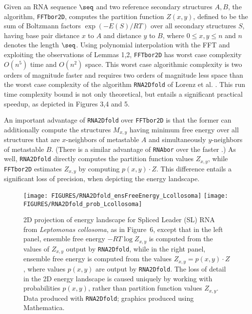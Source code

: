 Given an RNA sequence $\seq$ and two reference secondary structures $A,B$,
the algorithm, {\tt FFTbor2D}, computes the partition
function $Z(x,y)$, defined to be the sum of Boltzmann factors
$\exp(-E(S)/RT)$ over all secondary structures $S$, having base pair
distance $x$ to  $A$ and distance $y$ to $B$, where
$0 \leq x,y \leq n$ and $n$ denotes the length $\seq$.
Using polynomial interpolation with the FFT and exploiting the observations
of Lemmas 1,2, {\tt FFTbor2D} has worst case complexity
$O(n^5)$ time and $O(n^2)$ space. This worst case
algorithmic complexity is two orders of magnitude faster and requires two
orders of magnitude less space than the worst case complexity of the
algorithm {\tt RNA2Dfold} of Lorenz et al. \cite{hofacker:RNAbor2D}.
This run time complexity bound is not only theoretical, but entails
a significant practical speedup, as depicted in
Figures 3,4 and 5.

An important advantage of
{\tt RNA2Dfold} over {\tt FFTbor2D} is that the former can additionally
compute the structures $M_{x,y}$ having minimum free energy over all
structures that are $x$-neighbors of metastable $A$ and simultaneously
$y$-neighbors of metastable $B$. (There is a similar advantage of {\tt RNAbor}
\cite{Freyhult.b07} over the faster \fftbor \cite{fftbor}.)
As well, {\tt RNA2Dfold} directly computes the partition function values
$Z_{x,y}$, while {\tt FFTbor2D} estimates $Z_{x,y}$ by computing
$p(x,y) \cdot Z$. This difference entails a significant loss of precision,
when depicting the energy landscape.


\begin{figure}[!t]
\begin{center}
\texttt{[image: FIGURES/RNA2Dfold\_ensFreeEnergy\_Lcollosoma]}
\hskip 1cm
\texttt{[image: FIGURES/RNA2Dfold\_prob\_Lcollosoma]}
\caption{\small
2D projection of energy landscape for Spliced Leader (SL) RNA
from {\em Leptomonas collosoma}, as in
Figure~6,
except that in the left panel, ensemble free energy $-RT \log Z_{x,y}$
is computed from the values of $Z_{x,y}$ output by {\tt RNA2Dfold},
while in the right panel, ensemble free energy is computed from
the values $Z_{x,y} = p(x,y) \cdot Z$, where values $p(x,y)$ are output
by {\tt RNA2Dfold}.
The loss of detail in the 2D energy landscape is caused uniquely by
working with probabilities $p(x,y)$, rather than partition function
values $Z_{x,y}$.
Data produced with {\tt RNA2Dfold}; graphics produced using Mathematica.
}
\label{fig:heatmapRNA2Dfold}
\end{center}
\end{figure}

